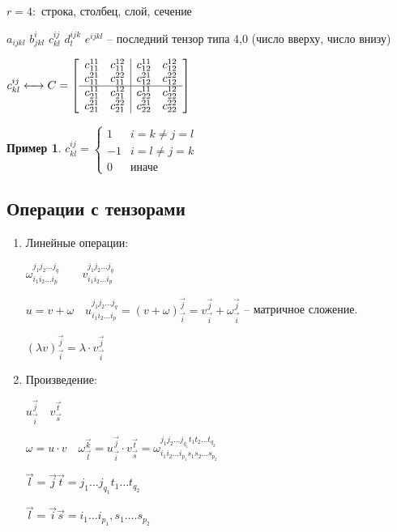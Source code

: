 \documentclass{book}
\theoremstyle{definition}
\newtheorem*{example}{Пример}
\begin{document}
\begin{definition}
             $r = 4:$ строка, столбец, слой, сечение

             $a_{ijkl}$  $b^i_{jkl}$ $c^{ij}_{kl}$  $d^{ijk}_l$  $e^{ijkl}$ -- последний тензор типа 4,0 (число вверху, число внизу)

             $c^{ij}_{kl} \longleftrightarrow C = 
             \left[\begin{array}{c c | c c}
                 c_{11}^{11} & c_{11}^{12} & c_{12}^{11} & c_{12}^{12}\\
                 c_{11}^{21} & c_{11}^{22} & c_{12}^{21} & c_{12}^{22}\\ \hline
                 c_{21}^{11} & c_{21}^{12} & c_{22}^{11} & c_{22}^{12}\\
                 c_{21}^{21} & c_{21}^{22} & c_{22}^{21} & c_{22}^{22}\\
         \end{array}\right]$

        \end{definition}
        \begin{example}
            $c_{kl}^{ij} = \begin{cases}
                1 & i=k\neq j=l\\
            -1 & i = l \neq  j = k\\
        0 & \text{иначе}\end{cases}
            $
        \end{example}

        \subsection{Операции с тензорами}

        \begin{enumerate}
            \item Линейные операции:
                
                $\omega_{i_1 i_2 \ldots i_p}^{j_1 j_2 \ldots j_q}\qquad v_{i_1 i_2 \ldots i_p}^{j_1 j_2 \ldots j_q}$

                $u = v+\omega\quad u_{i_1 i_2 \ldots i_p}^{j_1 j_2 \ldots j_q} = (v+\omega)_{\vec i}^{\vec j} = v_{\vec i}^{\vec j} + \omega_{\vec i}^{\vec j}$ -- матричное сложение.

                $(\lambda v)_{\vec i}^{\vec j} = \lambda \cdot  v_{\vec i}^{\vec j}$
            \item Произведение:

                $u_{\vec i}^{\vec j}\quad v_{\vec s}^{\vec t}$

                $\omega = u \cdot v\quad \omega_{\vec l}^{\vec k} = u_{\vec i}^{\vec j}\cdot  v_{\vec s}^{\vec t} = \omega_{i_1 i_2 \ldots i_{p_1}s_1s_2 \ldots s_{p_2}}^{j_1 j_2 \ldots j_{q_1}t_1 t_2 \ldots t_{q_2}}$

                $\vec l = \vec j\vec t = j_1 \ldots j_{q_1}t_1 \ldots t_{q_2}$

                $\vec l = \vec i \vec s = i_1 \ldots i_{p_1}, s_1 \ldots. s_{p_2}$
        \end{enumerate}
\end{document}
